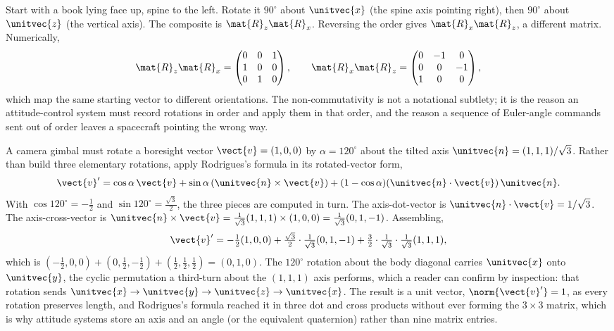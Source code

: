 \begin{example}
Start with a book lying face up, spine to the left. Rotate it
$90^{\circ}$ about $\unitvec{x}$ (the spine axis pointing right),
then $90^{\circ}$ about $\unitvec{z}$ (the vertical axis). The
composite is $\mat{R}_{z}\mat{R}_{x}$. Reversing the order gives
$\mat{R}_{x}\mat{R}_{z}$, a different matrix. Numerically,
\[
\mat{R}_{z}\mat{R}_{x} =
\begin{pmatrix} 0 & 0 & 1 \\ 1 & 0 & 0 \\ 0 & 1 & 0 \end{pmatrix},
\qquad
\mat{R}_{x}\mat{R}_{z} =
\begin{pmatrix} 0 & -1 & 0 \\ 0 & 0 & -1 \\ 1 & 0 & 0 \end{pmatrix},
\]
which map the same starting vector to different orientations. The
non-commutativity is not a notational subtlety; it is the reason an
attitude-control system must record rotations in order and apply them
in that order, and the reason a sequence of Euler-angle commands sent
out of order leaves a spacecraft pointing the wrong way.
\end{example}

\begin{example}
A camera gimbal must rotate a boresight vector $\vect{v} = (1, 0, 0)$
by $\alpha = 120^{\circ}$ about the tilted axis $\unitvec{n} =
(1, 1, 1)/\sqrt{3}$. Rather than build three elementary rotations,
apply Rodrigues's formula in its rotated-vector form,
\[
\vect{v}' = \cos\alpha\,\vect{v} + \sin\alpha\,(\unitvec{n}\times
\vect{v}) + (1 - \cos\alpha)(\unitvec{n}\cdot\vect{v})\,\unitvec{n}.
\]
With $\cos 120^{\circ} = -\tfrac{1}{2}$ and $\sin 120^{\circ} =
\tfrac{\sqrt{3}}{2}$, the three pieces are computed in turn. The
axis-dot-vector is $\unitvec{n}\cdot\vect{v} = 1/\sqrt{3}$. The
axis-cross-vector is $\unitvec{n}\times\vect{v} = \tfrac{1}{\sqrt{3}}
(1, 1, 1)\times(1, 0, 0) = \tfrac{1}{\sqrt{3}}(0, 1, -1)$. Assembling,
\[
\vect{v}' = -\tfrac{1}{2}(1, 0, 0) + \tfrac{\sqrt{3}}{2}\cdot
\tfrac{1}{\sqrt{3}}(0, 1, -1) + \tfrac{3}{2}\cdot\tfrac{1}{\sqrt{3}}
\cdot\tfrac{1}{\sqrt{3}}(1, 1, 1),
\]
which is $(-\tfrac{1}{2}, 0, 0) + (0, \tfrac{1}{2}, -\tfrac{1}{2}) +
(\tfrac{1}{2}, \tfrac{1}{2}, \tfrac{1}{2}) = (0, 1, 0)$. The
$120^{\circ}$ rotation about the body diagonal carries $\unitvec{x}$
onto $\unitvec{y}$, the cyclic permutation a third-turn about the
$(1,1,1)$ axis performs, which a reader can confirm by inspection: that
rotation sends $\unitvec{x}\to\unitvec{y}\to\unitvec{z}\to\unitvec{x}$.
The result is a unit vector, $\norm{\vect{v}'} = 1$, as every rotation
preserves length, and Rodrigues's formula reached it in three dot and
cross products without ever forming the $3\times 3$ matrix, which is
why attitude systems store an axis and an angle (or the equivalent
quaternion) rather than nine matrix entries.
\end{example}

